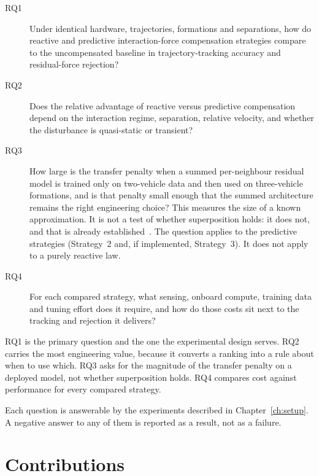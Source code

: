 \begin{description}
  \item[RQ1] Under identical hardware, trajectories, formations and separations, how do reactive
    and predictive interaction-force compensation strategies compare to the uncompensated baseline
    in trajectory-tracking accuracy and residual-force rejection?

  \item[RQ2] Does the relative advantage of reactive versus predictive compensation depend on the
    interaction regime, separation, relative velocity, and whether the disturbance is
    quasi-static or transient?

  \item[RQ3] How large is the transfer penalty when a summed per-neighbour residual model is
    trained only on two-vehicle data and then used on three-vehicle formations, and is that penalty
    small enough that the summed architecture remains the right engineering choice? This measures
    the size of a known approximation. It is not a test of whether superposition holds: it does
    not, and that is already established~\cite{shi2020neuralswarm,gielis2023aggregate}. The question
    applies to the predictive strategies (Strategy~2 and, if implemented, Strategy~3). It does not
    apply to a purely reactive law.

  \item[RQ4] For each compared strategy, what sensing, onboard compute, training data and tuning
    effort does it require, and how do those costs sit next to the tracking and rejection it
    delivers?
\end{description}

RQ1 is the primary question and the one the experimental design serves. RQ2 carries the most
engineering value, because it converts a ranking into a rule about when to use which. RQ3 asks for
the magnitude of the transfer penalty on a deployed model, not whether superposition holds.
RQ4 compares cost against performance for every compared strategy.

Each question is answerable by the experiments described in Chapter~\ref{ch:setup}. A negative
answer to any of them is reported as a result, not as a failure.

\section{Contributions}
\label{sec:intro-contrib}

